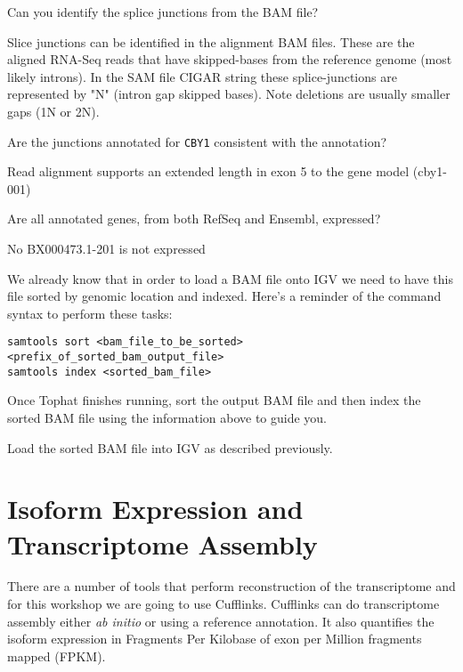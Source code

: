 \begin{questions}
Can you identify the splice junctions from the BAM file?
\begin{answer}
Slice junctions can be identified in the alignment BAM files.
These are the aligned RNA-Seq reads that have skipped-bases from the reference genome (most likely introns).
In the SAM file CIGAR string these splice-junctions are represented by "N" (intron gap skipped bases). 
Note deletions are usually smaller gaps (1N or 2N). 
\end{answer}

Are the junctions annotated for \texttt{CBY1} consistent with the annotation?
\begin{answer}
Read alignment supports an extended length in exon 5 to the gene model (cby1-001) 
\end{answer}

Are all annotated genes, from both RefSeq and Ensembl, expressed?
\begin{answer}
No BX000473.1-201 is not expressed
\end{answer}

\end{questions}

\begin{information}
We already know that in order to load a BAM file onto IGV we need to have
this file sorted by genomic location and indexed. Here's a reminder of the
command syntax to perform these tasks:

\begin{lstlisting}
samtools sort <bam_file_to_be_sorted> <prefix_of_sorted_bam_output_file>
samtools index <sorted_bam_file>
\end{lstlisting}

\end{information}

\begin{steps}
Once Tophat finishes running, sort the output BAM file and then index the
sorted BAM file using the information above to guide you.

Load the sorted BAM file into IGV as described previously.
\end{steps}

\newpage
\section{Isoform Expression and Transcriptome Assembly}
There are a number of tools that perform reconstruction of the transcriptome
and for this workshop we are going to use Cufflinks. Cufflinks can do
transcriptome assembly either \textit{ab initio} or using a reference annotation. It
also quantifies the isoform expression in Fragments
Per Kilobase of exon per Million fragments mapped (FPKM).

